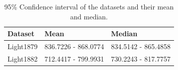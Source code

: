 \documentclass{article}
\begin{document}
    \begin{table}
    \begin{center}
    \begin{tabular}{l|ll}
        \hline 
        Dataset & Mean & Median \\
        \hline
        Light1879 & 836.7226 - 868.0774 & 834.5142 - 865.4858 \\
        Light1882 & 712.4417 - 799.9931 & 730.2243 - 817.7757 \\
        \hline
    \end{tabular}
    \caption{95\% Confidence interval of the datasets and their mean and median.}
    \label{table:LightMeanMedian}
    \end{center}
    \end{table}

    \begin{figure}

\end{figure}
\end{document}
